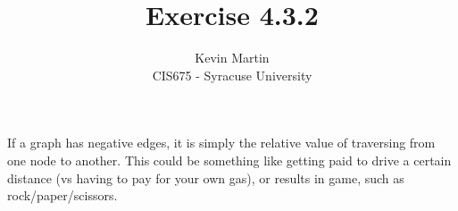 \documentclass{article}
\author{Kevin Martin\\ CIS675 - Syracuse University}
\title{Exercise 4.3.2}
\begin{document}
\maketitle
If a graph has negative edges, it is simply the relative value
of traversing from one node to another. This could be something like
getting paid to drive a certain distance (vs having to pay for 
your own gas), or results in game, such as rock/paper/scissors.
\end{document}
